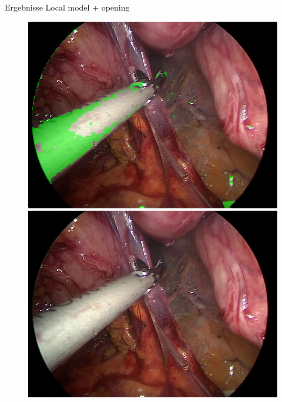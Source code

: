 \begin{frame}{Ergebnisse Local model + opening}
\begin{figure}[ht]
\begin{minipage}[b]{0.45\linewidth}
            \includegraphics[width=\textwidth]{../images/model-303/img_29_raw-overlay.png}\\
            \includegraphics[width=\textwidth]{../images/op4-img_34.png}
        \end{minipage}
    \end{figure}
\end{frame}
